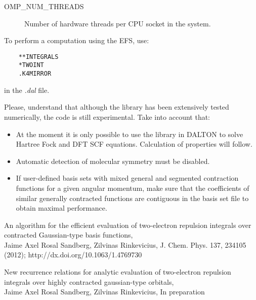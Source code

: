 \documentclass[a4paper,11pt]{paper}
\begin{document}
\begin{description}
    \item[OMP\_NUM\_THREADS] Number of hardware threads per CPU socket in the system.
\end{description}

To perform a computation using the EFS, use:

\begin{verbatim}
    **INTEGRALS
    *TWOINT
    .K4MIRROR
\end{verbatim}

in the {\it .dal} file.


Please, understand that although the library has been extensively tested numerically, the code is still experimental. Take into account that:

\begin{itemize}
  \item At the moment it is only possible to use the library in DALTON to solve Hartree Fock and DFT SCF equations. Calculation of properties will follow. 
  \item Automatic detection of molecular symmetry must be disabled. 
  \item If user-defined basis sets with mixed general and segmented contraction functions for a given angular momentum, make sure that the coefficients of similar generally contracted functions are contiguous in the basis set file to obtain maximal performance.
\end{itemize}


\begin{thebibliography}{99}

 An algorithm for the efficient evaluation of two-electron repulsion integrals over contracted Gaussian-type basis functions, \\ Jaime Axel Rosal Sandberg, Zilvinas Rinkevicius, J. Chem. Phys. 137, 234105 (2012); http://dx.doi.org/10.1063/1.4769730

 New recurrence relations for analytic evaluation of two-electron repulsion integrals over highly contracted gaussian-type orbitals, \\ Jaime Axel Rosal Sandberg, Zilvinas Rinkevicius, In preparation

\end{thebibliography}
\end{document}
